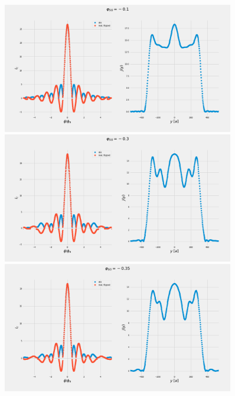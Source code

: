 \documentclass[a4paper]{article}
\begin{document}
\begin{figure}
	\includegraphics[width=0.9\textwidth]{figs/wg31double/current_and_density_01}
	\includegraphics[width=0.9\textwidth]{figs/wg31double/current_and_density_03}
	\includegraphics[width=0.9\textwidth]{figs/wg31double/current_and_density_035}
\end{figure}
\end{document}
